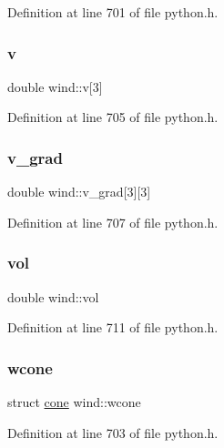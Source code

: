Definition at line 701 of file python.\+h.

\mbox{\label{structwind_a9e2fcac3826b36b7a4eed3eb74f45ede}} 
\subsubsection{\texorpdfstring{v}{v}}
{\footnotesize\ttfamily double wind\+::v\mbox{[}3\mbox{]}}



Definition at line 705 of file python.\+h.

\mbox{\label{structwind_a7f9f96a08008c3354c3f681b3d9c672e}} 
\subsubsection{\texorpdfstring{v\+\_\+grad}{v\_grad}}
{\footnotesize\ttfamily double wind\+::v\+\_\+grad\mbox{[}3\mbox{]}\mbox{[}3\mbox{]}}



Definition at line 707 of file python.\+h.

\mbox{\label{structwind_a86864abe3bc4d97d1b4c305f085c6c55}} 
\subsubsection{\texorpdfstring{vol}{vol}}
{\footnotesize\ttfamily double wind\+::vol}



Definition at line 711 of file python.\+h.

\mbox{\label{structwind_a4d0d6b2e0e7f6d8500f66efdb639f233}} 
\subsubsection{\texorpdfstring{wcone}{wcone}}
{\footnotesize\ttfamily struct \hyperlink{structcone}{cone} wind\+::wcone}



Definition at line 703 of file python.\+h.

\mbox{\label{structwind_aa79ef3a918f25e67318af1200ea49bd7}} 
